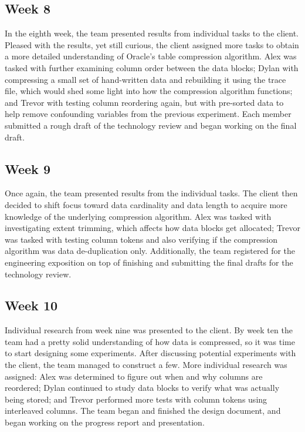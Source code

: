 \documentclass[10pt]{article}
\begin{document}
\subsection{Week 8}
In the eighth week, the team presented results from individual tasks to the client. Pleased with the results, yet still curious, the client assigned more tasks to obtain a more detailed understanding of Oracle's table compression algorithm. Alex was tasked with  further examining  column order between the data blocks; Dylan with compressing a small set of hand-written data and rebuilding it using the trace file, which would shed some light into how the compression algorithm functions; and Trevor with testing column reordering again, but with pre-sorted data to help remove confounding variables from the previous experiment. Each member submitted a rough draft of the technology review and began working on the final draft.

\subsection{Week 9}
Once again, the team presented results from the individual tasks. The client then decided to shift focus toward data cardinality and data length to acquire more knowledge of the underlying compression algorithm. Alex was tasked with investigating extent trimming, which affects how data blocks get allocated; Trevor was tasked with testing column tokens and also verifying if the compression algorithm was data de-duplication only. Additionally, the team registered for the engineering exposition on top of finishing and submitting the final drafts for the technology review.

\subsection{Week 10}
Individual research from week nine was presented to the client. By week ten the team had a pretty solid understanding of how data is compressed, so it was time to start designing some experiments. After discussing potential experiments with the client, the team managed to construct a few. More individual research was assigned: Alex was determined to figure out when and why columns are reordered; Dylan continued to study data blocks to verify what was actually being stored; and Trevor performed more tests with column tokens using interleaved columns. The team began and finished the design document, and began working on the progress report and presentation.
\end{document}
